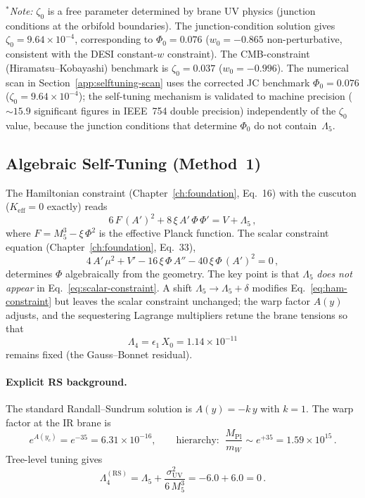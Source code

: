\noindent
${}^*$\textit{Note:} $\zeta_0$ is a free parameter determined by brane UV physics (junction conditions at the orbifold boundaries). The junction-condition solution gives $\zeta_0 = 9.64 \times 10^{-4}$, corresponding to $\Phi_0 = 0.076$ ($w_0 = -0.865$ non-perturbative, consistent with the DESI constant-$w$ constraint). The CMB-constraint (Hiramatsu--Kobayashi) benchmark is $\zeta_0 = 0.037$ ($w_0 = -0.996$). The numerical scan in Section~\ref{app:selftuning-scan} uses the corrected JC benchmark $\Phi_0 = 0.076$ ($\zeta_0 = 9.64 \times 10^{-4}$); the self-tuning mechanism is validated to machine precision (${\sim}15.9$ significant figures in IEEE~754 double precision) independently of the $\zeta_0$ value, because the junction conditions that determine $\Phi_0$ do not contain~$\Lambda_5$.

\subsection{Algebraic Self-Tuning (Method~1)}

The Hamiltonian constraint (Chapter~\ref{ch:foundation}, Eq.~16) with the cuscuton ($K_{\mathrm{eff}} = 0$ exactly) reads
\begin{equation}
  6\,F\,(A')^2 + 8\,\xi\,A'\,\Phi\,\Phi' = V + \Lambda_5 \,,
  \label{eq:ham-constraint}
\end{equation}
where $F = M_5^3 - \xi\,\Phi^2$ is the effective Planck function. The scalar constraint equation (Chapter~\ref{ch:foundation}, Eq.~33),
\begin{equation}
  4\,A'\,\mu^2 + V' - 16\,\xi\,\Phi\,A'' - 40\,\xi\,\Phi\,(A')^2 = 0 \,,
  \label{eq:scalar-constraint}
\end{equation}
determines $\Phi$ algebraically from the geometry. The key point is that $\Lambda_5$ \emph{does not appear} in Eq.~\eqref{eq:scalar-constraint}. A shift $\Lambda_5 \to \Lambda_5 + \delta$ modifies Eq.~\eqref{eq:ham-constraint} but leaves the scalar constraint unchanged; the warp factor $A(y)$ adjusts, and the sequestering Lagrange multipliers retune the brane tensions so that
\begin{equation}
  \Lambda_4 = \epsilon_1\,X_0 = 1.14 \times 10^{-11}
  \label{eq:Lambda4-residual}
\end{equation}
remains fixed (the Gauss--Bonnet residual).

\paragraph{Explicit RS background.}
The standard Randall--Sundrum solution is $A(y) = -k\,y$ with $k = 1$. The warp factor at the IR brane is
\begin{equation}
  e^{A(y_c)} = e^{-35} = 6.31 \times 10^{-16}, \qquad
  \text{hierarchy:}\;\; \frac{M_{\mathrm{Pl}}}{m_W} \sim e^{+35} = 1.59 \times 10^{15}\,.
\end{equation}
Tree-level tuning gives
\begin{equation}
  \Lambda_4^{(\mathrm{RS})} = \Lambda_5 + \frac{\sigma_{\mathrm{UV}}^2}{6\,M_5^3}
    = -6.0 + 6.0 = 0\,.
\end{equation}


